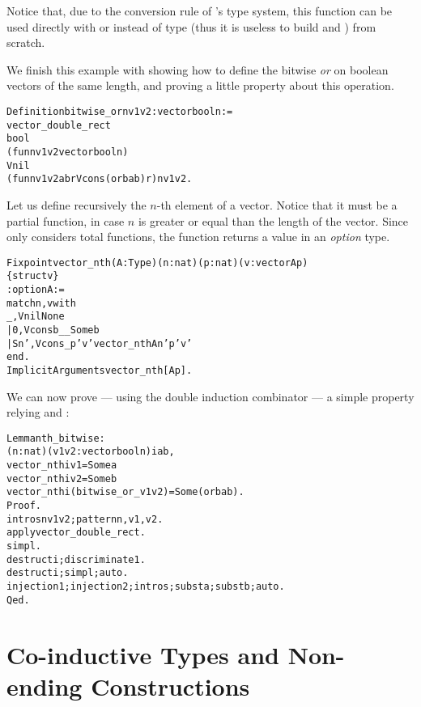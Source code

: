 \documentclass[11pt]{article}
\begin{document}
Notice that, due to the conversion rule of {\coq}'s type system,
this function can be used directly with  or 
instead of type (thus it is useless to build
 and ) from scratch.

We finish this example with showing how to define the bitwise
\emph{or} on boolean vectors of the same length,
and proving a little property about this
operation.

\begin{alltt}
Definition bitwise_or n v1 v2 : vector bool n :=
   vector_double_rect
    bool
    (fun n v1 v2 {\funarrow} vector bool n)
    Vnil
    (fun n v1 v2 a b r {\funarrow} Vcons (orb a b) r) n v1 v2.
\end{alltt}

Let us  define recursively the $n$-th element of a vector. Notice
that it must be a partial function, in case $n$ is greater or equal
than the length of the vector. Since {\coq} only considers total
functions, the function returns a value in an \emph{option} type.

\begin{alltt}
Fixpoint vector_nth (A:Type)(n:nat)(p:nat)(v:vector A p)
                  \{struct v\}
                  : option A :=
  match n,v  with
    _   , Vnil {\funarrow} None
  | 0   , Vcons b  _ _ {\funarrow} Some b
  | S n', Vcons _  p' v' {\funarrow} vector_nth A n'  p' v'
  end.
Implicit Arguments vector_nth [A p].
\end{alltt}

We can now prove --- using the double induction combinator ---
a simple property relying  and :

\begin{alltt}
Lemma nth_bitwise :
   {\prodsym} (n:nat) (v1 v2: vector bool n) i  a b,
      vector_nth i v1 = Some a {\arrow}
      vector_nth i v2 = Some b {\arrow}
      vector_nth i (bitwise_or _ v1 v2) = Some (orb a b).
Proof.
 intros  n v1 v2; pattern n,v1,v2.
 apply vector_double_rect.
 simpl.
 destruct i; discriminate 1.
 destruct i; simpl;auto.
 injection 1; injection 2;intros; subst a; subst b; auto.
Qed.
\end{alltt}


\section{Co-inductive Types and Non-ending Constructions}
\label{CoInduction}
\end{document}
